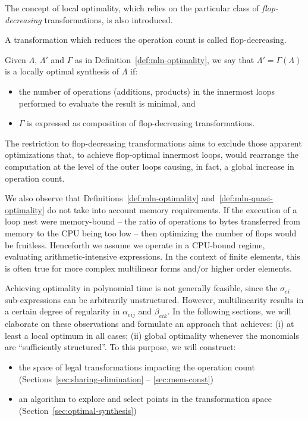The concept of local optimality, which relies on the particular class of \textit{flop-decreasing} transformations, is also introduced.

\begin{Def}
A transformation which reduces the operation count is called flop-decreasing.
\end{Def}

\begin{Def}
\label{def:mln-quasi-optimality}
Given $\Lambda$, $\Lambda'$ and $\Gamma$ as in Definition~\ref{def:mln-optimality}, we say that $\Lambda' = \Gamma (\Lambda)$ is a locally optimal synthesis of $\Lambda$ if:
\begin{itemize}
\item the number of operations (additions, products) in the innermost loops performed to evaluate the result is minimal, and
\item $\Gamma$ is expressed as composition of flop-decreasing transformations.
\end{itemize}
\end{Def}

The restriction to flop-decreasing transformations aims to exclude those apparent optimizations that, to achieve flop-optimal innermost loops, would rearrange the computation at the level of the outer loops causing, in fact, a global increase in operation count. 

We also observe that Definitions~\ref{def:mln-optimality} and~\ref{def:mln-quasi-optimality} do not take into account memory requirements. If the execution of a loop nest were memory-bound -- the ratio of operations to bytes transferred from memory to the CPU being too low -- then optimizing the number of flops would be fruitless. Henceforth we assume we operate in a CPU-bound regime, evaluating arithmetic-intensive expressions. In the context of finite elements, this is often true for more complex multilinear forms and/or higher order elements. 

Achieving optimality in polynomial time is not generally feasible, since the $\sigma_{ei}$ sub-expressions can be arbitrarily unstructured. However, multilinearity results in a certain degree of regularity in $\alpha_{eij}$ and $\beta_{eik}$. In the following sections, we will elaborate on these observations and formulate an approach that achieves: (i) at least a local optimum in all cases; (ii) global optimality whenever the monomials are ``sufficiently structured''. To this purpose, we will construct:
\begin{itemize}
\item the space of legal transformations impacting the operation count (Sections~\ref{sec:sharing-elimination} -- \ref{sec:mem-const})
\item an algorithm to explore and select points in the transformation space (Section~\ref{sec:optimal-synthesis})
\end{itemize}


